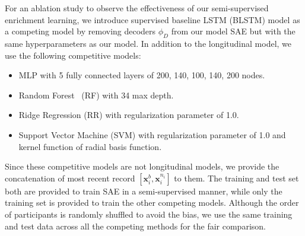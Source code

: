 For an ablation study to observe the effectiveness of our semi-supervised enrichment learning, we introduce supervised baseline LSTM (BLSTM) model as a competing model by removing decoders $\phi_{D}$ from our model SAE but with the same hyperparameters as our model. In addition to the longitudinal model, we use the following competitive models:
\begin{itemize}
    \item MLP with 5 fully connected layers of 200, 140, 100, 140, 200 nodes.
    \item Random Forest~\cite{ho1995random} (RF) with 34 max depth.
    \item Ridge Regression (RR) with regularization parameter of 1.0.
    \item Support Vector Machine (SVM) with regularization parameter of 1.0 and kernel function of radial basis function.
\end{itemize}
Since these competitive models are not longitudinal models, we provide the concatenation of most recent record $[\mathbf{x}_i^b, \mathbf{x}_i^{n_i}]$ to them. The training and test set both are provided to train SAE in a semi-supervised manner, while only the training set is provided to train the other competing models. Although the order of participants is randomly shuffled to avoid the bias, we use the same training and test data across all the competing methods for the fair comparison.

